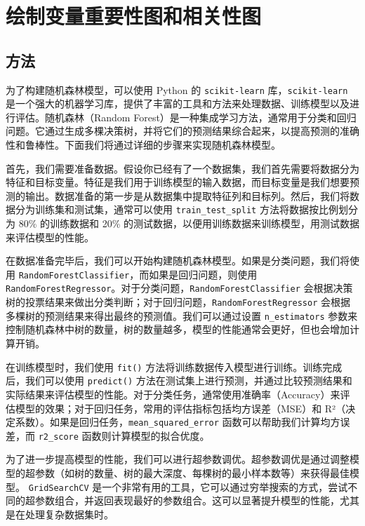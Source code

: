 \documentclass[AutoFakeBold]{LZUThesis-PgD&PhD}
\begin{document}
\section{绘制变量重要性图和相关性图}
    
	
	
	
    	\subsection{方法}
	
        为了构建随机森林模型，可以使用 Python 的 \texttt{scikit-learn} 库，\texttt{scikit-learn} 是一个强大的机器学习库，提供了丰富的工具和方法来处理数据、训练模型以及进行评估。随机森林（Random Forest）是一种集成学习方法，通常用于分类和回归问题。它通过生成多棵决策树，并将它们的预测结果综合起来，以提高预测的准确性和鲁棒性。下面我们将通过详细的步骤来实现随机森林模型。

        首先，我们需要准备数据。假设你已经有了一个数据集，我们首先需要将数据分为特征和目标变量。特征是我们用于训练模型的输入数据，而目标变量是我们想要预测的输出。数据准备的第一步是从数据集中提取特征列和目标列。然后，我们将数据分为训练集和测试集，通常可以使用 \texttt{train\_test\_split} 方法将数据按比例划分为 80\% 的训练数据和 20\% 的测试数据，以便用训练数据来训练模型，用测试数据来评估模型的性能。
        
        在数据准备完毕后，我们可以开始构建随机森林模型。如果是分类问题，我们将使用 \texttt{RandomForestClassifier}，而如果是回归问题，则使用 \texttt{RandomForestRegressor}。对于分类问题，\texttt{RandomForestClassifier} 会根据决策树的投票结果来做出分类判断；对于回归问题，\texttt{RandomForestRegressor} 会根据多棵树的预测结果来得出最终的预测值。我们可以通过设置 \texttt{n\_estimators} 参数来控制随机森林中树的数量，树的数量越多，模型的性能通常会更好，但也会增加计算开销。
        
        在训练模型时，我们使用 \texttt{fit()} 方法将训练数据传入模型进行训练。训练完成后，我们可以使用 \texttt{predict()} 方法在测试集上进行预测，并通过比较预测结果和实际结果来评估模型的性能。对于分类任务，通常使用准确率（Accuracy）来评估模型的效果；对于回归任务，常用的评估指标包括均方误差（MSE）和 R²（决定系数）。如果是回归任务，\texttt{mean\_squared\_error} 函数可以帮助我们计算均方误差，而 \texttt{r2\_score} 函数则计算模型的拟合优度。
        
        为了进一步提高模型的性能，我们可以进行超参数调优。超参数调优是通过调整模型的超参数（如树的数量、树的最大深度、每棵树的最小样本数等）来获得最佳模型。 \texttt{GridSearchCV} 是一个非常有用的工具，它可以通过穷举搜索的方式，尝试不同的超参数组合，并返回表现最好的参数组合。这可以显著提升模型的性能，尤其是在处理复杂数据集时。
        
\end{document}
